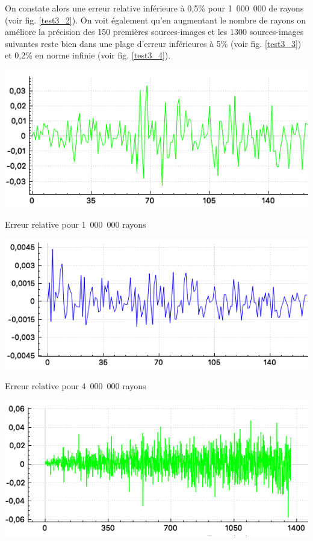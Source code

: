 On constate alors une erreur relative inférieure à 0,5\% pour 1~000~000 de rayons (voir fig. \ref{test3_2}). On voit également qu'en augmentant le nombre de rayons on améliore la précision des 150 premières sources-images et les 1300 sources-images suivantes reste bien dans une plage d'erreur inférieures à 5\% (voir fig. \ref{test3_3}) et 0,2\% en norme infinie (voir fig. \ref{test3_4}).

\begin{figureth}
	\begin{subfigureth}{0.8\textwidth}
		\includegraphics[width=\linewidth]{images/test3_1}
		\caption{Erreur relative pour 1~000~000 rayons}
		\label{test3_1}
	\end{subfigureth}
	\begin{subfigureth}{0.8\textwidth}
		\includegraphics[width=\linewidth]{images/test3_2}
		\caption{Erreur relative pour 4~000~000 rayons}
		\label{test3_2}
	\end{subfigureth}
	\begin{subfigureth}{0.8\textwidth}
		\includegraphics[width=\linewidth]{images/test3_3}

\end{subfigureth}
\end{figureth}
